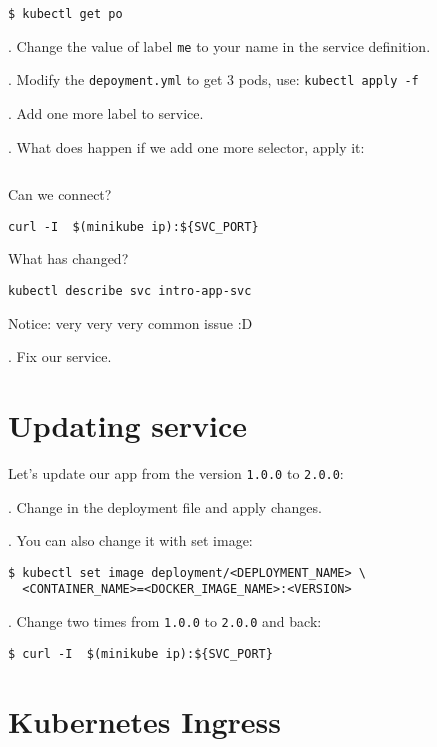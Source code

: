 \documentclass[12pt, letterpaper]{article}
\begin{document}
\begin{verbatim}
$ kubectl get po
\end{verbatim}

. Change the value of label \verb|me| to your name in the service definition.

. Modify the \verb|depoyment.yml| to get 3 pods, use: \texttt{kubectl apply -f}

. Add one more label to service.

. What does happen if we add one more selector, apply it:

\inputminted{yaml}{introduction/exercise-broke-svc/kube-service-broke.yml}


Can we connect?

\begin{verbatim}
curl -I  $(minikube ip):${SVC_PORT}
\end{verbatim}

What has changed?
\begin{verbatim}
kubectl describe svc intro-app-svc
\end{verbatim}

\bigskip
Notice: {\large very very very common issue} :D

. Fix our service.

%
%
%
\section{Updating service}

Let's update our app from the version \verb|1.0.0| to \verb|2.0.0|:

. Change in the deployment file and apply changes.

. You can also change it with set image:

\begin{verbatim}
$ kubectl set image deployment/<DEPLOYMENT_NAME> \
  <CONTAINER_NAME>=<DOCKER_IMAGE_NAME>:<VERSION>
\end{verbatim}

. Change two times from \verb|1.0.0| to \verb|2.0.0| and back:

\begin{verbatim}
$ curl -I  $(minikube ip):${SVC_PORT}
\end{verbatim}

%
%
%
\pagebreak
\section{Kubernetes Ingress}
\end{document}
